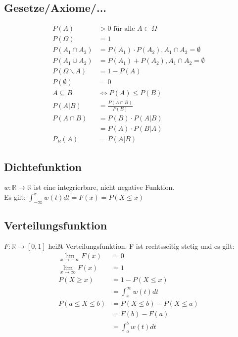 \documentclass[a4paper, 11pt]{article}
\newcommand{\limFromTo}[2]{ \lim\limits_{#2 \rightarrow #1}}
\begin{document}
\begin{multicols}{3}
\begin{small}
    	\subsection{Gesetze/Axiome/...}
	    	\begin{align*}
	    	P(A) &> 0 \text{ für alle } A \subset \Omega\\
	    	P(\Omega) &= 1\\
	    	P(A_1 \cap A_2) &= P(A_1) \cdot P(A_2), A_1 \cap A_2 = \emptyset \\
	    	P(A_1 \cup A_2) &= P(A_1) + P(A_2), A_1 \cap A_2 = \emptyset \\
	    	P(\Omega \backslash A) &= 1 - P(A)\\
	    	P(\emptyset) &= 0\\
	    	A \subseteq B &\iff P(A) \leq P(B) \\
	    	P(A|B) &= \frac{P(A \cap B)}{P(B)} \\
	    	P(A\cap B) &= P(B) \cdot P(A|B)\\
	    	&= P(A) \cdot P(B|A)\\
	    	P_B(A) &= P(A|B)
	    	\end{align*}
	    
	    \subsection{Dichtefunktion}
	    	$w: \mathbb{R} \rightarrow \mathbb{R}$ ist eine integrierbare, nicht negative Funktion. \\
	    	Es gilt: $\int_{-\infty}^{x} w(t) dt = F(x) = P(X \leq x)$
	    \subsection{Verteilungsfunktion}
	    	$F: \mathbb{R} \rightarrow \left[0,1\right]$ heißt Verteilungsfunktion.
	    	F ist rechtsseitig stetig und es gilt:
	    	\begin{align*}
	    		\limFromTo{-\infty}{x} F(x) &= 0\\
	    		\limFromTo{\infty}{x} F(x) &= 1\\
	    		P(X \geq x) &= 1 - P(X \leq x) \\
	    					&= \int_{x}^{\infty} w(t)dt\\
	    		P(a \le X \le b) &= P(X \le b) - P(X \le a)\\
	    						 &= F(b) - F(a) \\
	    						 &= \int_{a}^{b} w(t)dt
	    	\end{align*}

\end{small}
\end{multicols}
\end{document}
